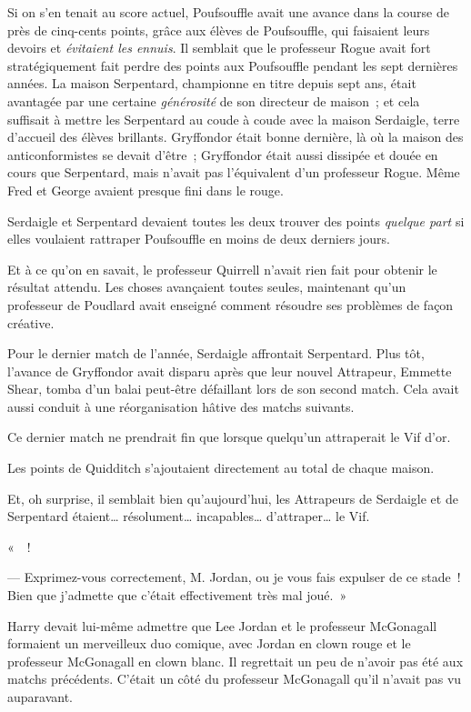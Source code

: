 Si on s'en tenait au score actuel, Poufsouffle avait une avance dans la course de près de cinq-cents points, grâce aux élèves de Poufsouffle, qui faisaient leurs devoirs et \emph{évitaient les ennuis}.
Il semblait que le professeur Rogue avait fort stratégiquement fait perdre des points aux Poufsouffle pendant les sept dernières années.
La maison Serpentard, championne en titre depuis sept ans, était avantagée par une certaine \emph{générosité} de son directeur de maison~; et cela suffisait à mettre les Serpentard au coude à coude avec la maison Serdaigle, terre d'accueil des élèves brillants.
Gryffondor était bonne dernière, là où la maison des anticonformistes se devait d'être~; Gryffondor était aussi dissipée et douée en cours que Serpentard, mais n'avait pas l'équivalent d'un professeur Rogue.
Même Fred et George avaient presque fini dans le rouge.

Serdaigle et Serpentard devaient toutes les deux trouver des points \emph{quelque part} si elles voulaient rattraper Poufsouffle en moins de deux derniers jours.

Et à ce qu'on en savait, le professeur Quirrell n'avait rien fait pour obtenir le résultat attendu.
Les choses avançaient toutes seules, maintenant qu'un professeur de Poudlard avait enseigné comment résoudre ses problèmes de façon créative.

Pour le dernier match de l'année, Serdaigle affrontait Serpentard.
Plus tôt, l'avance de Gryffondor avait disparu après que leur nouvel Attrapeur, Emmette Shear, tomba d'un balai peut-être défaillant lors de son second match.
Cela avait aussi conduit à une réorganisation hâtive des matchs suivants.

Ce dernier match ne prendrait fin que lorsque quelqu'un attraperait le Vif d'or.

Les points de Quidditch s'ajoutaient directement au total de chaque maison.

Et, oh surprise, il semblait bien qu'aujourd'hui, les Attrapeurs de Serdaigle et de Serpentard étaient… résolument… incapables… d'attraper… le Vif.

«~~!

--- Exprimez-vous correctement, M. Jordan, ou je vous fais expulser de ce stade~!
Bien que j'admette que c'était effectivement très mal joué.~»

Harry devait lui-même admettre que Lee Jordan et le professeur McGonagall formaient un merveilleux duo comique, avec Jordan en clown rouge et le professeur McGonagall en clown blanc.
Il regrettait un peu de n'avoir pas été aux matchs précédents.
C'était un côté du professeur McGonagall qu'il n'avait pas vu auparavant.

